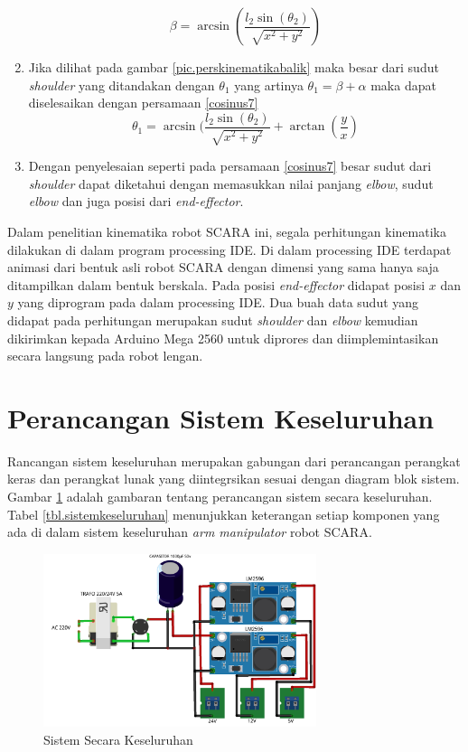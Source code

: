 \begin{enumerate}
	\begin{equation}
	\beta=\arcsin(\frac{l_{2}\sin(\theta_{2})}{\sqrt{x^2+y^2}})
	\label{cosinus6}
	\end{equation}
	\item Jika dilihat pada gambar \ref{pic.perskinematikabalik} maka besar dari sudut \textit{shoulder} yang ditandakan dengan $\theta_{1}$ yang artinya $\theta_{1}=\beta+\alpha$ maka dapat diselesaikan dengan persamaan \ref{cosinus7}
	\begin{equation}
	\theta_{1}=\arcsin(\frac{l_{2}\sin(\theta_{2})}{\sqrt{x^2+y^2}}+\arctan(\frac{y}{x})
	\label{cosinus7}
	\end{equation}
	\item  Dengan penyelesaian seperti pada persamaan \ref{cosinus7} besar sudut dari \textit{shoulder} dapat diketahui dengan memasukkan nilai panjang \textit{elbow}, sudut \textit{elbow} dan juga posisi dari \textit{end-effector}.
\end{enumerate}

Dalam penelitian kinematika robot SCARA ini, segala perhitungan kinematika dilakukan di dalam program processing IDE. Di dalam processing IDE terdapat animasi dari bentuk asli robot SCARA dengan dimensi yang sama hanya saja ditampilkan dalam bentuk berskala. Pada posisi \textit{end-effector} didapat posisi $x$ dan $y$ yang diprogram pada dalam processing IDE. Dua buah data sudut yang didapat pada perhitungan merupakan sudut \textit{shoulder} dan \textit{elbow} kemudian dikirimkan kepada Arduino Mega 2560 untuk diprores dan diimplemintasikan secara langsung pada robot lengan.

\section{Perancangan Sistem Keseluruhan}
Rancangan sistem keseluruhan merupakan gabungan dari perancangan perangkat keras dan perangkat lunak yang diintegrsikan sesuai dengan diagram blok sistem. Gambar \ref{pic.sistemkeseluruhan} adalah gambaran tentang perancangan sistem secara keseluruhan. Tabel \ref{tbl.sistemkeseluruhan}  menunjukkan keterangan setiap komponen yang ada di dalam sistem keseluruhan \textit{arm manipulator} robot SCARA. 
\begin{figure}[H]
	\centering
	\includegraphics[width=8cm]{gambar/catudaya_bb.png}
	\caption{Sistem Secara Keseluruhan}
	\label{pic.sistemkeseluruhan}
\end{figure}


